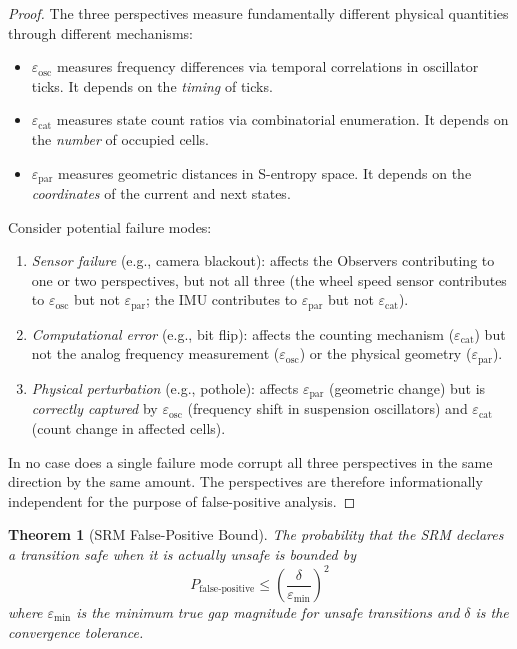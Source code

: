 \documentclass[twocolumn,10pt]{article}
\newtheorem{theorem}{Theorem}[section]
\theoremstyle{definition}
\begin{document}
\begin{proof}
The three perspectives measure fundamentally different physical quantities through different mechanisms:
\begin{itemize}[leftmargin=*]
\item $\varepsilon_{\mathrm{osc}}$ measures frequency differences via temporal correlations in oscillator ticks. It depends on the \emph{timing} of ticks.
\item $\varepsilon_{\mathrm{cat}}$ measures state count ratios via combinatorial enumeration. It depends on the \emph{number} of occupied cells.
\item $\varepsilon_{\mathrm{par}}$ measures geometric distances in S-entropy space. It depends on the \emph{coordinates} of the current and next states.
\end{itemize}
Consider potential failure modes:
\begin{enumerate}
\item \emph{Sensor failure} (e.g., camera blackout): affects the Observers contributing to one or two perspectives, but not all three (the wheel speed sensor contributes to $\varepsilon_{\mathrm{osc}}$ but not $\varepsilon_{\mathrm{par}}$; the IMU contributes to $\varepsilon_{\mathrm{par}}$ but not $\varepsilon_{\mathrm{cat}}$).
\item \emph{Computational error} (e.g., bit flip): affects the counting mechanism ($\varepsilon_{\mathrm{cat}}$) but not the analog frequency measurement ($\varepsilon_{\mathrm{osc}}$) or the physical geometry ($\varepsilon_{\mathrm{par}}$).
\item \emph{Physical perturbation} (e.g., pothole): affects $\varepsilon_{\mathrm{par}}$ (geometric change) but is \emph{correctly captured} by $\varepsilon_{\mathrm{osc}}$ (frequency shift in suspension oscillators) and $\varepsilon_{\mathrm{cat}}$ (count change in affected cells).
\end{enumerate}
In no case does a single failure mode corrupt all three perspectives in the same direction by the same amount. The perspectives are therefore informationally independent for the purpose of false-positive analysis.
\end{proof}

\begin{theorem}[SRM False-Positive Bound]
\label{thm:srm-false-positive}
The probability that the SRM declares a transition safe when it is actually unsafe is bounded by
\begin{equation}
P_{\mathrm{false\text{-}positive}} \leq \left(\frac{\delta}{\varepsilon_{\min}}\right)^2
\end{equation}
where $\varepsilon_{\min}$ is the minimum true gap magnitude for unsafe transitions and $\delta$ is the convergence tolerance.
\end{theorem}
\end{document}
